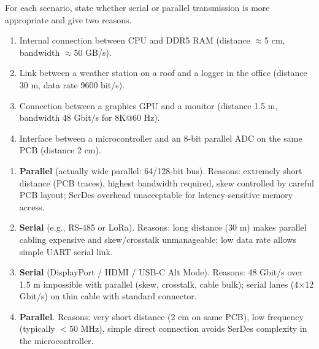 \documentclass[11pt]{article}
\newcounter{popsec}
\newcounter{popsub}
\newcommand{\courssub}[1]{%
  \stepcounter{popsub}%
  \par\vspace{9pt}\noindent{\popxbold\fontsize{11.5}{13}\selectfont\color{popink}{\color{poporange}\thepopsec.\thepopsub}\hspace{6pt}#1}\par\nopagebreak\vspace{4pt}
}
\begin{document}
\begin{exercice}
For each scenario, state whether serial or parallel transmission is more appropriate and give two reasons.
\begin{enumerate}
\item Internal connection between CPU and DDR5 RAM (distance $\approx$5 cm, bandwidth $\approx$50 GB/s).
\item Link between a weather station on a roof and a logger in the office (distance 30 m, data rate 9600 bit/s).
\item Connection between a graphics GPU and a monitor (distance 1.5 m, bandwidth 48 Gbit/s for 8K@60 Hz).
\item Interface between a microcontroller and an 8-bit parallel ADC on the same PCB (distance 2 cm).
\end{enumerate}
\end{exercice}

\begin{corrige}
\begin{enumerate}
\item \textbf{Parallel} (actually wide parallel: 64/128-bit bus). Reasons: extremely short distance (PCB traces), highest bandwidth required, skew controlled by careful PCB layout; SerDes overhead unacceptable for latency-sensitive memory access.
\item \textbf{Serial} (e.g., RS-485 or LoRa). Reasons: long distance (30 m) makes parallel cabling expensive and skew/crosstalk unmanageable; low data rate allows simple UART serial link.
\item \textbf{Serial} (DisplayPort / HDMI / USB-C Alt Mode). Reasons: 48 Gbit/s over 1.5 m impossible with parallel (skew, crosstalk, cable bulk); serial lanes (4$\times$12 Gbit/s) on thin cable with standard connector.
\item \textbf{Parallel}. Reasons: very short distance (2 cm on same PCB), low frequency (typically $<$50 MHz), simple direct connection avoids SerDes complexity in the microcontroller.
\end{enumerate}
\end{corrige}

\courssub{Summary}
\end{document}
